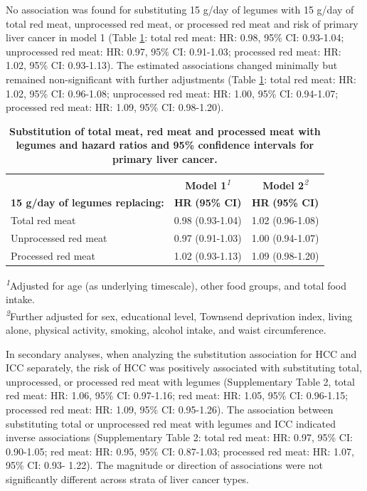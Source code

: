 \documentclass[sn-basic,Numbered,iicol,pdflatex]{sn-jnl}
\begin{document}
No association was found for substituting 15 g/day of legumes with 15
g/day of total red meat, unprocessed red meat, or processed red meat and
risk of primary liver cancer in model 1 (Table \ref{tab3}: total red
meat:
HR: 0.98, 95\% CI: 0.93-1.04;
unprocessed red meat:
HR: 0.97, 95\% CI: 0.91-1.03;
processed red meat:
HR: 1.02, 95\% CI: 0.93-1.13).
The estimated associations changed minimally but remained
non-significant with further adjustments (Table \ref{tab3}: total red
meat:
HR: 1.02, 95\% CI: 0.96-1.08;
unprocessed red meat:
HR: 1.00, 95\% CI: 0.94-1.07;
processed red meat:
HR: 1.09, 95\% CI: 0.98-1.20).

\begin{table}[!t]
\caption{{\small \textbf{Substitution of total meat, red meat and processed meat with legumes and hazard ratios and 95\% confidence intervals for primary liver cancer.}}}\label{tab3}
\begin{tabular*}{1\linewidth}{@{\extracolsep{\fill}}lcc}
\toprule
 & {\bfseries \textbf{Model 1}}\textsuperscript{\textit{1}} & {\bfseries \textbf{Model 2}}\textsuperscript{\textit{2}} \\ 
\cmidrule(lr){2-2} \cmidrule(lr){3-3}
\textbf{15 g/day of legumes replacing:} & \textbf{HR} \textbf{(95\% CI)} & \textbf{HR} \textbf{(95\% CI)} \\ 
\midrule\addlinespace[2.5pt]
Total red meat & 0.98 (0.93-1.04) & 1.02 (0.96-1.08) \\ 
Unprocessed red meat & 0.97 (0.91-1.03) & 1.00 (0.94-1.07) \\ 
Processed red meat & 1.02 (0.93-1.13) & 1.09 (0.98-1.20) \\ 
\bottomrule
\end{tabular*}
\begin{minipage}{\linewidth}
\textsuperscript{\textit{1}}Adjusted for age (as underlying timescale), other food groups, and total food intake.\\
\textsuperscript{\textit{2}}Further adjusted for sex, educational level, Townsend deprivation index, living alone, physical activity, smoking, alcohol intake, and waist circumference.\\
\end{minipage}
\end{table}

In secondary analyses, when analyzing the substitution association for
HCC and ICC separately, the risk of HCC was positively associated with
substituting total, unprocessed, or processed red meat with legumes
(Supplementary Table 2, total red meat:
HR: 1.06, 95\% CI: 0.97-1.16;
red meat:
HR: 1.05, 95\% CI: 0.96-1.15;
processed red meat:
HR: 1.09, 95\% CI: 0.95-1.26).
The association between substituting total or unprocessed red meat with
legumes and ICC indicated inverse associations (Supplementary Table 2:
total red meat:
HR: 0.97, 95\% CI: 0.90-1.05;
red meat:
HR: 0.95, 95\% CI: 0.87-1.03;
processed red meat:
HR: 1.07, 95\% CI: 0.93- 1.22).
The magnitude or direction of associations were not significantly
different across strata of liver cancer types.
\end{document}
